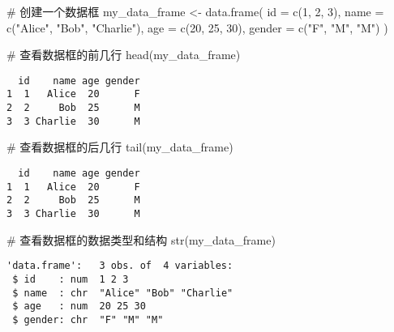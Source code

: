 \documentclass[
  letterpaper,
  DIV=11,
  numbers=noendperiod]{scrreprt}
\newenvironment{Shaded}{\begin{snugshade}}{\end{snugshade}}
\newcommand{\AttributeTok}[1]{\textcolor[rgb]{0.40,0.45,0.13}{#1}}
\newcommand{\CommentTok}[1]{\textcolor[rgb]{0.37,0.37,0.37}{#1}}
\newcommand{\DecValTok}[1]{\textcolor[rgb]{0.68,0.00,0.00}{#1}}
\newcommand{\FunctionTok}[1]{\textcolor[rgb]{0.28,0.35,0.67}{#1}}
\newcommand{\NormalTok}[1]{\textcolor[rgb]{0.00,0.23,0.31}{#1}}
\newcommand{\OtherTok}[1]{\textcolor[rgb]{0.00,0.23,0.31}{#1}}
\newcommand{\StringTok}[1]{\textcolor[rgb]{0.13,0.47,0.30}{#1}}
\begin{document}
\begin{Shaded}
\begin{Highlighting}[]
\CommentTok{\# 创建一个数据框}
\NormalTok{my\_data\_frame }\OtherTok{\textless{}{-}} \FunctionTok{data.frame}\NormalTok{(}
  \AttributeTok{id =} \FunctionTok{c}\NormalTok{(}\DecValTok{1}\NormalTok{, }\DecValTok{2}\NormalTok{, }\DecValTok{3}\NormalTok{),}
  \AttributeTok{name =} \FunctionTok{c}\NormalTok{(}\StringTok{"Alice"}\NormalTok{, }\StringTok{"Bob"}\NormalTok{, }\StringTok{"Charlie"}\NormalTok{),}
  \AttributeTok{age =} \FunctionTok{c}\NormalTok{(}\DecValTok{20}\NormalTok{, }\DecValTok{25}\NormalTok{, }\DecValTok{30}\NormalTok{),}
  \AttributeTok{gender =} \FunctionTok{c}\NormalTok{(}\StringTok{"F"}\NormalTok{, }\StringTok{"M"}\NormalTok{, }\StringTok{"M"}\NormalTok{)}
\NormalTok{)}

\CommentTok{\# 查看数据框的前几行}
\FunctionTok{head}\NormalTok{(my\_data\_frame)}
\end{Highlighting}
\end{Shaded}

\begin{verbatim}
  id    name age gender
1  1   Alice  20      F
2  2     Bob  25      M
3  3 Charlie  30      M
\end{verbatim}

\begin{Shaded}
\begin{Highlighting}[]
\CommentTok{\# 查看数据框的后几行}
\FunctionTok{tail}\NormalTok{(my\_data\_frame)}
\end{Highlighting}
\end{Shaded}

\begin{verbatim}
  id    name age gender
1  1   Alice  20      F
2  2     Bob  25      M
3  3 Charlie  30      M
\end{verbatim}

\begin{Shaded}
\begin{Highlighting}[]
\CommentTok{\# 查看数据框的数据类型和结构}
\FunctionTok{str}\NormalTok{(my\_data\_frame)}
\end{Highlighting}
\end{Shaded}

\begin{verbatim}
'data.frame':   3 obs. of  4 variables:
 $ id    : num  1 2 3
 $ name  : chr  "Alice" "Bob" "Charlie"
 $ age   : num  20 25 30
 $ gender: chr  "F" "M" "M"
\end{verbatim}
\end{document}
